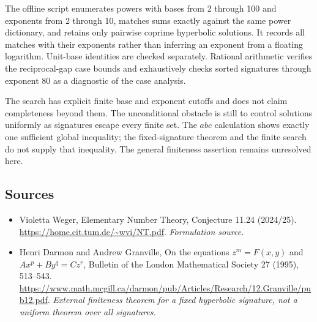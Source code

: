 \documentclass[11pt]{article}
\begin{document}
The offline script enumerates powers with bases from 2 through 100 and exponents from 2 through 10, matches sums exactly against the same power dictionary, and retains only pairwise coprime hyperbolic solutions. It records all matches with their exponents rather than inferring an exponent from a floating logarithm. Unit-base identities are checked separately. Rational arithmetic verifies the reciprocal-gap case bounds and exhaustively checks sorted signatures through exponent 80 as a diagnostic of the case analysis.

The search has explicit finite base and exponent cutoffs and does not claim completeness beyond them. The unconditional obstacle is still to control solutions uniformly as signatures escape every finite set. The $abc$ calculation shows exactly one sufficient global inequality; the fixed-signature theorem and the finite search do not supply that inequality. The general finiteness assertion remains unresolved here.

\subsection{Sources}
\begin{itemize}
\item[S1]Violetta Weger, Elementary Number Theory, Conjecture 11.24 (2024/25).
\url{https://home.cit.tum.de/~wvi/NT.pdf}.
\textit{Formulation source.}
\item[E1]Henri Darmon and Andrew Granville, On the equations $z^m=F(x,y)$ and $Ax^p+By^q=Cz^r$, Bulletin of the London Mathematical Society 27 (1995), 513--543.
\url{https://www.math.mcgill.ca/darmon/pub/Articles/Research/12.Granville/pub12.pdf}.
\textit{External finiteness theorem for a fixed hyperbolic signature, not a uniform theorem over all signatures.}
\end{itemize}
\end{document}
